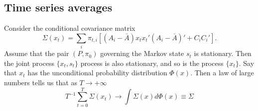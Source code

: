 %
%










\subsection{Time series averages}
Consider the conditional covariance matrix
$$\Sigma(x_t)  = \sum_i \pi_{t,i} [ (A_i - \bar A) x_t x_t' (A_i - \bar A)' + C_i C_i' ] .$$
Assume that the pair $(P, \pi_0)$ governing the  Markov state $s_t$ is stationary. Then  the joint process $\{x_t, s_t\}$ process is also  stationary,
and so is the  process $\{x_t\}$. Say that $x_t$ has  the unconditional probability distribution $\Phi(x)$.
Then a law of large numbers tells us that as $ {T \rightarrow + \infty}$
$$ T^{-1} \sum_{t=0}^T \Sigma(x_t)  \rightarrow \int \Sigma(x) d \Phi(x) \equiv \Sigma $$


